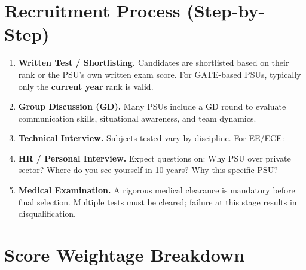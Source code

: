 \section{Recruitment Process (Step-by-Step)}
\label{sec:psu-process}

\begin{enumerate}[label=\textcolor{pfBlue}{\bfseries Stage \arabic*:}, itemsep=8pt, leftmargin=*]

  \item \textbf{Written Test / \GATE Shortlisting.}
        Candidates are shortlisted based on their \GATE rank or the PSU's own
        written exam score. For GATE-based PSUs, typically only the
        \textbf{current year} rank is valid.

  \item \textbf{Group Discussion (GD).}
        Many PSUs include a GD round to evaluate communication skills,
        situational awareness, and team dynamics.

  \item \textbf{Technical Interview.}
        Subjects tested vary by discipline. For EE/ECE:

  \item \textbf{HR / Personal Interview.}
        Expect questions on: Why PSU over private sector? Where do you see yourself
        in 10 years? Why this specific PSU?

  \item \textbf{Medical Examination.}
        A rigorous medical clearance is mandatory before final selection.
        Multiple tests must be cleared; failure at this stage results in
        disqualification.

\end{enumerate}

\section{Score Weightage Breakdown}
\label{sec:psu-weightage}

